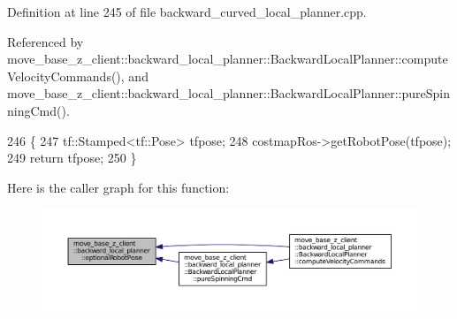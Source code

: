 Definition at line 245 of file backward\+\_\+curved\+\_\+local\+\_\+planner.\+cpp.



Referenced by move\+\_\+base\+\_\+z\+\_\+client\+::backward\+\_\+local\+\_\+planner\+::\+Backward\+Local\+Planner\+::compute\+Velocity\+Commands(), and move\+\_\+base\+\_\+z\+\_\+client\+::backward\+\_\+local\+\_\+planner\+::\+Backward\+Local\+Planner\+::pure\+Spinning\+Cmd().


\begin{DoxyCode}
246 \{
247     tf::Stamped<tf::Pose> tfpose;
248     costmapRos->getRobotPose(tfpose);
249     \textcolor{keywordflow}{return} tfpose;
250 \}
\end{DoxyCode}


Here is the caller graph for this function\+:
\nopagebreak
\begin{figure}[H]
\begin{center}
\leavevmode
\includegraphics[width=350pt]{namespacemove__base__z__client_1_1backward__local__planner_a80dbd10807e5f70adfcd0ff4dcb7c1db_icgraph}
\end{center}
\end{figure}


